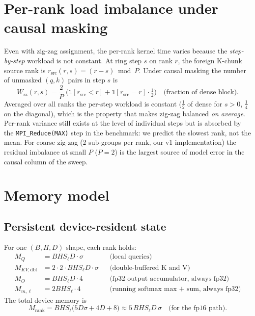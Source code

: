 \documentclass[11pt]{article}
\newcommand{\zz}{\mathrm{zz}}
\newcommand{\Bd}{\sigma}        %
\newcommand{\indicator}[1]{\mathbb{1}\!\left[#1\right]}
\begin{document}
\section{Per-rank load imbalance under causal masking}
\label{sec:imbalance}

Even with zig-zag assignment, the per-rank kernel time varies because
the \emph{step-by-step} workload is not constant. At ring step $s$
on rank $r$, the foreign K-chunk source rank is
$r_{\text{src}}(r, s) = (r - s) \bmod P$. Under causal masking
the number of unmasked $(q, k)$ pairs in step $s$ is
\begin{equation}
  W_\zz(r, s) =
  \frac{2}{P}\;\Big(
    \indicator{r_{\text{src}} < r}
    + \indicator{r_{\text{src}} = r} \cdot \tfrac{1}{2}
  \Big)
  \quad\text{(fraction of dense block).}
\end{equation}
Averaged over all ranks the per-step workload is constant
($\tfrac{1}{2}$ of dense for $s>0$, $\tfrac{1}{4}$ on the diagonal),
which is the property that makes zig-zag balanced \emph{on average}.
Per-rank variance still exists at the level of individual steps but is
absorbed by the \texttt{MPI\_Reduce(MAX)} step in the benchmark: we
predict the slowest rank, not the mean. For coarse zig-zag
(2 sub-groups per rank, our v1 implementation) the residual imbalance
at small $P$ ($P{=}2$) is the largest source of model error in the
causal column of the sweep.

\section{Memory model}
\label{sec:memory}

\subsection{Persistent device-resident state}

For one $(B, H, D)$ shape, each rank holds:
\begin{align}
  M_{Q}           &= B H S_\ell D \cdot \Bd & &\text{(local queries)}\\
  M_{KV,\text{dbl}} &= 2 \cdot 2 \cdot B H S_\ell D \cdot \Bd
                   & &\text{(double-buffered K and V)}\\
  M_{O}           &= B H S_\ell D \cdot 4
                   & &\text{(fp32 output accumulator, always fp32)} \\
  M_{m,\ell}       &= 2 B H S_\ell \cdot 4
                   & &\text{(running softmax max + sum, always fp32)}
\end{align}
The total device memory is
\begin{equation}
  M_\text{rank}
  = B H S_\ell \bigl(5 D \Bd + 4 D + 8\bigr)
  \approx 5\,B H S_\ell D\,\Bd
  \quad\text{(for the fp16 path).}
  \label{eq:mem_rank}
\end{equation}
\end{document}
